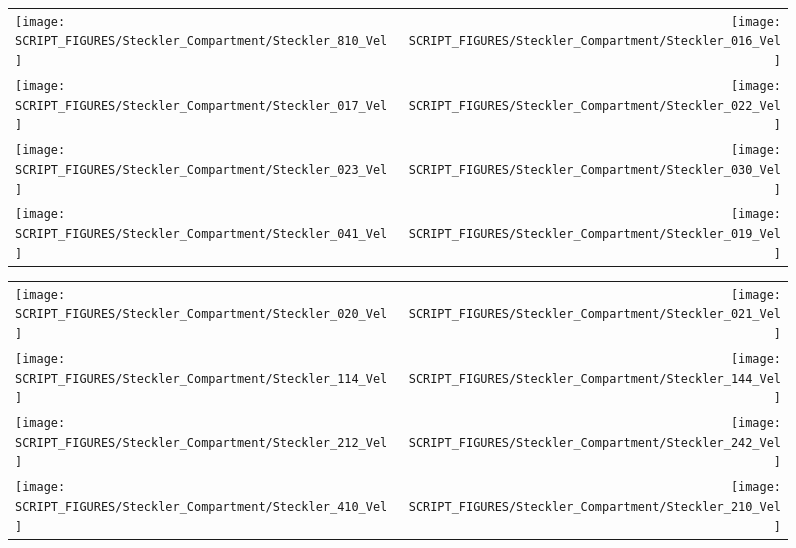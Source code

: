 \begin{figure}[p]
\begin{tabular*}{\textwidth}{l@{\extracolsep{\fill}}r}
\texttt{[image: SCRIPT\_FIGURES/Steckler\_Compartment/Steckler\_810\_Vel]} &
\texttt{[image: SCRIPT\_FIGURES/Steckler\_Compartment/Steckler\_016\_Vel]} \\
\texttt{[image: SCRIPT\_FIGURES/Steckler\_Compartment/Steckler\_017\_Vel]} &
\texttt{[image: SCRIPT\_FIGURES/Steckler\_Compartment/Steckler\_022\_Vel]} \\
\texttt{[image: SCRIPT\_FIGURES/Steckler\_Compartment/Steckler\_023\_Vel]} &
\texttt{[image: SCRIPT\_FIGURES/Steckler\_Compartment/Steckler\_030\_Vel]} \\
\texttt{[image: SCRIPT\_FIGURES/Steckler\_Compartment/Steckler\_041\_Vel]} &
\texttt{[image: SCRIPT\_FIGURES/Steckler\_Compartment/Steckler\_019\_Vel]}
\end{tabular*}
\label{Steckler_Vel_2}
\end{figure}

\begin{figure}[p]
\begin{tabular*}{\textwidth}{l@{\extracolsep{\fill}}r}
\texttt{[image: SCRIPT\_FIGURES/Steckler\_Compartment/Steckler\_020\_Vel]} &
\texttt{[image: SCRIPT\_FIGURES/Steckler\_Compartment/Steckler\_021\_Vel]} \\
\texttt{[image: SCRIPT\_FIGURES/Steckler\_Compartment/Steckler\_114\_Vel]} &
\texttt{[image: SCRIPT\_FIGURES/Steckler\_Compartment/Steckler\_144\_Vel]} \\
\texttt{[image: SCRIPT\_FIGURES/Steckler\_Compartment/Steckler\_212\_Vel]} &
\texttt{[image: SCRIPT\_FIGURES/Steckler\_Compartment/Steckler\_242\_Vel]} \\
\texttt{[image: SCRIPT\_FIGURES/Steckler\_Compartment/Steckler\_410\_Vel]} &
\texttt{[image: SCRIPT\_FIGURES/Steckler\_Compartment/Steckler\_210\_Vel]}
\end{tabular*}
\label{Steckler_Vel_3}
\end{figure}

